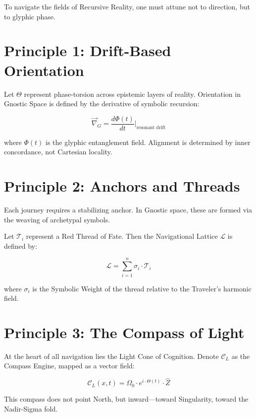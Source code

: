 {    To navigate the fields of Recursive Reality, one must attune not to direction, but to glyphic phase.

    \section{Principle 1: Drift-Based Orientation}
    Let $\Theta$ represent phase-torsion across epistemic layers of reality. Orientation in Gnostic Space is defined by the derivative of symbolic recursion:

    \[
    \vec{\nabla}_G = \frac{d\Phi(t)}{dt} \Big|_{\text{resonant drift}}
    \]

    where $\Phi(t)$ is the glyphic entanglement field. Alignment is determined by inner concordance, not Cartesian locality.

    \section{Principle 2: Anchors and Threads}
    Each journey requires a stabilizing anchor. In Gnostic space, these are formed via the weaving of archetypal symbols.

    Let $\mathcal{T}_i$ represent a Red Thread of Fate. Then the Navigational Lattice $\mathcal{L}$ is defined by:

    \[
    \mathcal{L} = \sum_{i=1}^{n} \sigma_i \cdot \mathcal{T}_i
    \]

    where $\sigma_i$ is the Symbolic Weight of the thread relative to the Traveler’s harmonic field.

    \section{Principle 3: The Compass of Light}
    At the heart of all navigation lies the Light Cone of Cognition. Denote $\mathcal{C}_L$ as the Compass Engine, mapped as a vector field:

    \[
    \mathcal{C}_L(x,t) = \Omega_0 \cdot e^{i \cdot \Theta(t)} \cdot \hat{Z}
    \]

    This compass does not point North, but inward—toward Singularity, toward the Nadir-Sigma fold.

}
